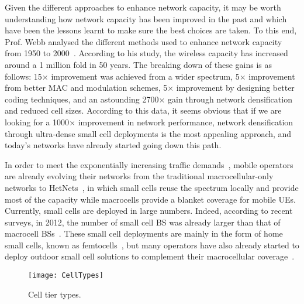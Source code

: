 \documentclass{IEEEtran}
\begin{document}
Given the different approaches to enhance network capacity,
it may be worth understanding how network capacity has been improved in the past and which have been the lessons learnt
to make sure the best choices are taken.
To this end, Prof. Webb analysed the different methods used to enhance network capacity from 1950 to 2000~\cite{Webb2007}.
According to his study, the wireless capacity has increased around a 1 million fold in 50 years.
The breaking down of these gains is as follows:
15$\times$ improvement was achieved from a wider spectrum,
5$\times$ improvement from better \ac{MAC} and modulation schemes,
5$\times$ improvement by designing better coding techniques,
and an astounding  2700$\times$ gain through network densification and reduced cell sizes.
According to this data,
it seems obvious that if we are looking for a 1000$\times$ improvement in network performance,
network densification through ultra-dense small cell deployments is the most appealing approach,
and today's networks have already started going down this path.

In order to meet the exponentially increasing traffic demands~\cite{Cisco_TrafficUpdate_2015},
mobile operators are already evolving their networks from the traditional macrocellular-only networks to \acp{HetNet}~\cite{5876496, Lopez_perez2011HetNet},
in which small cells reuse the spectrum locally and provide most of the capacity
while macrocells provide a blanket coverage for mobile \acp{UE}.
Currently, small cells are deployed in large numbers.
Indeed, according to recent surveys, in 2012,
the number of small cell \ac{BS} was already larger than that of macrocell \acp{BS}~\cite{SmallCellForum2012}.
These small cell deployments are mainly in the form of home small cells,
known as femtocells~\cite{Chandrasekhar2008a, Claussen:08a, Lopez-Perez2009a},
but many operators have also already started to deploy outdoor small cell solutions to complement their macrocellular coverage~\cite{6166483}.

\begin{figure*}[t!]
  \centering
	\texttt{[image: CellTypes]}
  	\caption{Cell tier types.}
  	\label{fig:cell_tier_types}
\end{figure*}
\end{document}
